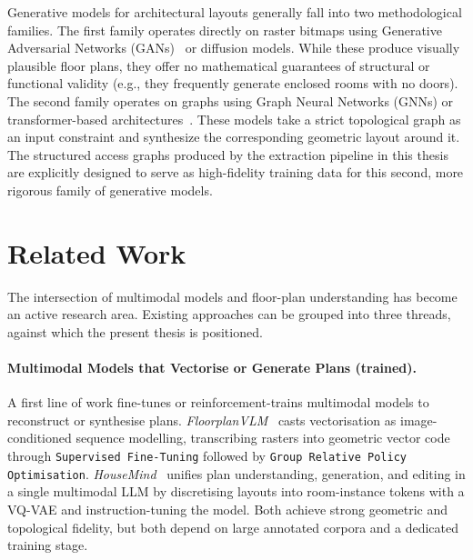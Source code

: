\documentclass[12pt,a4paper,openright]{report}
\begin{document}
Generative models for architectural layouts generally fall into two methodological families. The first family operates directly on raster bitmaps using Generative Adversarial Networks (GANs)~\cite{nauata2021housegangenerativeadversariallayout} or diffusion models. While these produce visually plausible floor plans, they offer no mathematical guarantees of structural or functional validity (e.g., they frequently generate enclosed rooms with no doors). The second family operates on graphs using Graph Neural Networks (GNNs) or transformer-based architectures~\cite{nauata2020houseganrelationalgenerativeadversarial}. These models take a strict topological graph as an input constraint and synthesize the corresponding geometric layout around it. The structured access graphs produced by the extraction pipeline in this thesis are explicitly designed to serve as high-fidelity training data for this second, more rigorous family of generative models.

\section{Related Work}
\label{sec:related-work}

The intersection of multimodal models and floor-plan understanding has become an active research area. Existing approaches can be grouped into three threads, against which the present thesis is positioned.

\paragraph{Multimodal Models that Vectorise or Generate Plans (trained).} A first line of work fine-tunes or reinforcement-trains multimodal models to reconstruct or synthesise plans. \textit{FloorplanVLM}~\cite{floorplanvlm2026} casts vectorisation as image-conditioned sequence modelling, transcribing rasters into geometric vector code through \texttt{Supervised Fine-Tuning} followed by \texttt{Group Relative Policy Optimisation}. \textit{HouseMind}~\cite{housemind2026} unifies plan understanding, generation, and editing in a single multimodal LLM by discretising layouts into room-instance tokens with a VQ-VAE and instruction-tuning the model. Both achieve strong geometric and topological fidelity, but both depend on large annotated corpora and a dedicated training stage.
\end{document}
